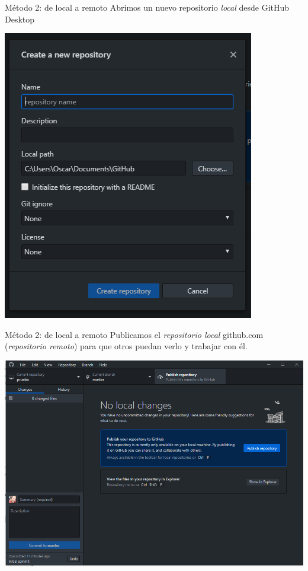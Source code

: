 \documentclass[xcolor={usenames,svgnames,dvipsnames}]{beamer}
\begin{document}
\begin{frame}[label={sec:org81008c9}]{Método 2: de local a remoto}
Abrimos un nuevo repositorio \emph{local} desde GitHub Desktop

\begin{center}
\end{center}

\begin{center}
\includegraphics[height=0.7\textheight]{figs/Desktop_NewRepository.png}
\end{center}
\end{frame}

\begin{frame}[label={sec:orgb58afb5}]{Método 2: de local a remoto}
Publicamos el \emph{repositorio local} github.com (\emph{repositorio remoto}) para que otros puedan verlo y trabajar con él.

\begin{center}
\includegraphics[width=.9\linewidth]{figs/Desktop_PublishRepository.png}
\end{center}
\end{frame}
\end{document}

